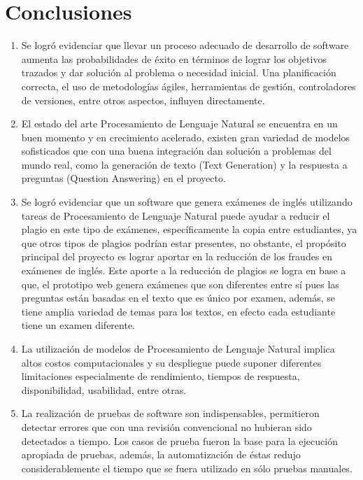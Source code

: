 \documentclass[../Main.tex]{subfiles}
\begin{document}
\section{Conclusiones}

    \begin{justify}
    
    \begin{enumerate}
        \item Se logró evidenciar que llevar un proceso adecuado de desarrollo de software aumenta las probabilidades de éxito en términos de lograr los objetivos trazados y dar solución al problema o necesidad inicial. Una planificación correcta, el uso de metodologías ágiles, herramientas de gestión, controladores de versiones, entre otros aspectos, influyen directamente.

        \item El estado del arte Procesamiento de Lenguaje Natural se encuentra en un buen momento y en crecimiento acelerado, existen gran variedad de modelos sofisticados que con una buena integración dan solución a problemas del mundo real, como la generación de texto (Text Generation) y la respuesta a preguntas (Question Answering) en el proyecto.
            
        \item Se logró evidenciar que un software que genera exámenes de inglés utilizando tareas de Procesamiento de Lenguaje Natural puede ayudar a reducir el plagio en este tipo de exámenes, específicamente la copia entre estudiantes, ya que otros tipos de plagios podrían estar presentes, no obstante, el propósito principal del proyecto es lograr aportar en la reducción de los fraudes en exámenes de inglés. Este aporte a la reducción de plagios se logra en base a que, el prototipo web genera exámenes que son diferentes entre sí pues las preguntas están basadas en el texto que es único por examen, además, se tiene amplia variedad de temas para los textos, en efecto cada estudiante tiene un examen diferente.
        
        \item La utilización de modelos de Procesamiento de Lenguaje Natural implica altos costos computacionales y su despliegue puede suponer diferentes limitaciones especialmente de rendimiento, tiempos de respuesta, disponibilidad, usabilidad, entre otras.
        
        \item La realización de pruebas de software son indispensables, permitieron detectar errores que con una revisión convencional no hubieran sido detectados a tiempo. Los casos de prueba fueron la base para la ejecución apropiada de pruebas, además, la automatización de éstas redujo considerablemente el tiempo que se fuera utilizado en sólo pruebas manuales. 
        
    \end{enumerate}
    
    \end{justify}
\end{document}
